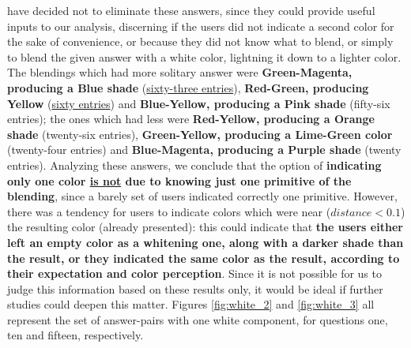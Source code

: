 have decided not to eliminate these answers, since they could provide useful inputs to our analysis, discerning if the users did not indicate a second color for the sake of convenience, or because they did not know what to blend, or simply to blend the given
answer with a white color, lightning it down to a lighter color. The blendings which had more solitary answer were \textbf{Green-Magenta, producing a Blue shade} (\ul{sixty-three entries}), \textbf{Red-Green, producing Yellow} (\ul{sixty entries}) and
\textbf{Blue-Yellow, producing a Pink shade} (fifty-six entries); the ones which had less were \textbf{Red-Yellow, producing a Orange shade} (twenty-six entries), \textbf{Green-Yellow, producing a Lime-Green color} (twenty-four entries) and \textbf{Blue-Magenta,
producing a Purple shade} (twenty entries). Analyzing these answers, we conclude that the option of \textbf{indicating only one color \ul{is not} due to knowing just one primitive of the blending}, since a barely set of users indicated correctly one primitive.
However, there was a tendency for users to indicate colors which were near ($distance < 0.1$) the resulting color (already presented): this could indicate that \textbf{the users either left an empty color as a whitening one, along with a darker shade than the
result, or they indicated the same color as the result, according to their expectation and color perception}. Since it is not possible for us to judge this information based on these results only, it would be ideal if further studies could deepen this matter.
Figures \ref{fig:white_2} and \ref{fig:white_3} all represent the set of answer-pairs with one white component, for questions one, ten and fifteen, respectively. \par
%
